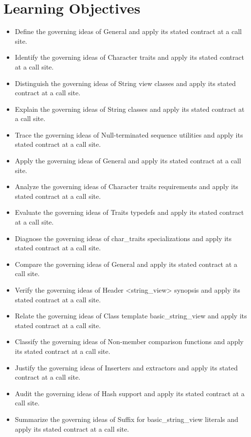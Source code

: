 \documentclass[11pt,letterpaper]{article}
\begin{document}
\section{Learning Objectives}
\begin{itemize}[label=\textcolor{CornellReferenceTeal}{$\blacktriangleright$}]
\item Define the governing ideas of General and apply its stated contract at a call site.
\item Identify the governing ideas of Character traits and apply its stated contract at a call site.
\item Distinguish the governing ideas of String view classes and apply its stated contract at a call site.
\item Explain the governing ideas of String classes and apply its stated contract at a call site.
\item Trace the governing ideas of Null-terminated sequence utilities and apply its stated contract at a call site.
\item Apply the governing ideas of General and apply its stated contract at a call site.
\item Analyze the governing ideas of Character traits requirements and apply its stated contract at a call site.
\item Evaluate the governing ideas of Traits typedefs and apply its stated contract at a call site.
\item Diagnose the governing ideas of char\_\allowbreak{}traits specializations and apply its stated contract at a call site.
\item Compare the governing ideas of General and apply its stated contract at a call site.
\item Verify the governing ideas of Header <string\_\allowbreak{}view> synopsis and apply its stated contract at a call site.
\item Relate the governing ideas of Class template basic\_\allowbreak{}string\_\allowbreak{}view and apply its stated contract at a call site.
\item Classify the governing ideas of Non-member comparison functions and apply its stated contract at a call site.
\item Justify the governing ideas of Inserters and extractors and apply its stated contract at a call site.
\item Audit the governing ideas of Hash support and apply its stated contract at a call site.
\item Summarize the governing ideas of Suffix for basic\_\allowbreak{}string\_\allowbreak{}view literals and apply its stated contract at a call site.
\end{itemize}
\end{document}
